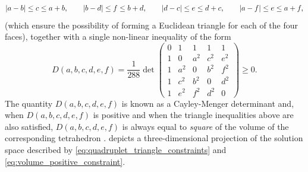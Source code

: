 \documentclass[notitlepage, 10pt]{article}
\begin{document}
\begin{exam}[Tetrahedral Horn's problem for \texorpdfstring{$d=2$}{d=2}]
    \begin{equation}
        \label{eq:quadruplet_triangle_constraints}
        \left|a-b\right| \leq c \leq a+b, \qquad
        \left|b-d\right| \leq f \leq b+d, \qquad
        \left|d-c\right| \leq e \leq d+c, \qquad
        \left|a-f\right| \leq e \leq a+f,
    \end{equation}
    (which ensure the possibility of forming a Euclidean triangle for each of the four faces),
    together with a single non-linear inequality of the form
    \begin{equation}
        \label{eq:volume_positive_constraint}
        D(a,b,c,d,e,f) = \frac{1}{288}\det
        \begin{pmatrix}
            0 & 1 & 1 & 1 & 1 \\
            1 & 0 & a^2 & c^2 & e^2 \\
            1 & a^2 & 0 & b^2 & f^2 \\
            1 & c^2 & b^2 & 0 & d^2 \\
            1 & e^2 & f^2 & d^2 & 0
        \end{pmatrix}
        \geq 0.
    \end{equation}
    The quantity $D(a,b,c,d,e,f)$ is known as a Cayley-Menger determinant and, when $D(a,b,c,d,e,f)$ is positive and when the triangle inequalities above are also satisfied, $D(a,b,c,d,e,f)$ is always equal to \textit{square} of the volume of the corresponding tetrahedron \cite[Equation 5.2]{sitharam2018handbook}\footnotemark{}.
     depicts a three-dimensional projection of the solution space described by \cref{eq:quadruplet_triangle_constraints} and \cref{eq:volume_positive_constraint}.


\end{exam}
\end{document}
